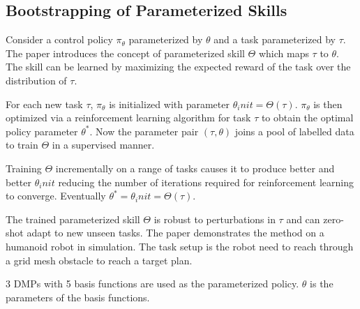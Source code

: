 \subsection{Bootstrapping of Parameterized Skills}

Consider a control policy $\pi_\theta$ parameterized by $\theta$ and a task parameterized by $\tau$. The paper introduces the concept of parameterized skill $\Theta $ which maps $\tau$ to $\theta$. The skill can be learned by maximizing the expected reward of the task over the distribution of $\tau$.

For each new task $\tau$, $\pi_\theta$ is initialized with parameter $\theta_init = \Theta(\tau)$. $\pi_\theta$ is then optimized via a reinforcement learning algorithm for task $\tau$ to obtain the optimal policy parameter $\theta^*$. Now the parameter pair $(\tau, \theta)$ joins a pool of labelled data to train $\Theta$ in a supervised manner.

Training $\Theta$ incrementally on a range of tasks causes it to produce better and better $\theta_init$ reducing the number of iterations required for reinforcement learning to converge. Eventually $\theta^* = \theta_init = \Theta(\tau)$.

The trained parameterized skill $\Theta$ is robust to perturbations in $\tau$ and can zero-shot adapt to new unseen tasks. The paper demonstrates the method on a humanoid robot in simulation. The task setup is the robot need to reach through a grid mesh obstacle to reach a target plan.

3 DMPs with 5 basis functions are used as the parameterized policy. $\theta$ is the parameters of the basis functions.
